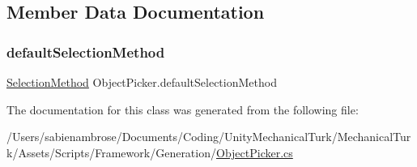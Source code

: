 \subsection{Member Data Documentation}
\mbox{\label{class_object_picker_a111abafc332a892a7155c876329e08f3}} 
\subsubsection{\texorpdfstring{default\+Selection\+Method}{defaultSelectionMethod}}
{\footnotesize\ttfamily \mbox{\hyperlink{_object_picker_8cs_a2dcef18caa6de91171bf235b9189206d}{Selection\+Method}} Object\+Picker.\+default\+Selection\+Method}



The documentation for this class was generated from the following file\+:\begin{DoxyCompactItemize}
\item 
/\+Users/sabienambrose/\+Documents/\+Coding/\+Unity\+Mechanical\+Turk/\+Mechanical\+Turk/\+Assets/\+Scripts/\+Framework/\+Generation/\mbox{\hyperlink{_object_picker_8cs}{Object\+Picker.\+cs}}\end{DoxyCompactItemize}
